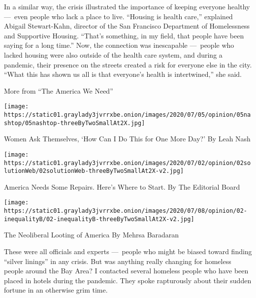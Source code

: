 In a similar way, the crisis illustrated the importance of keeping
everyone healthy ---~even people who lack a place to live. ``Housing is
health care,'' explained Abigail Stewart-Kahn, director of the San
Francisco Department of Homelessness and Supportive Housing. ``That's
something, in my field, that people have been saying for a long time.''
Now, the connection was inescapable ---~people who lacked housing were
also outside of the health care system, and during a pandemic, their
presence on the streets created a risk for everyone else in the city.
``What this has shown us all is that everyone's health is intertwined,''
she said.

 More from ``The America We Need''
\href{https://www.nytimes3xbfgragh.onion/2020/07/04/opinion/sunday/women-work-coronavirus.html?action=click\&pgtype=Article\&state=default\&region=MAIN_CONTENT_2\&context=storylines_related_links}{}

\texttt{[image: https://static01.graylady3jvrrxbe.onion/images/2020/07/05/opinion/05nashtop/05nashtop-threeByTwoSmallAt2X.jpg]}

 Women Ask Themselves, `How Can I Do This for One More Day?' By Leah
Nash

\href{https://www.nytimes3xbfgragh.onion/2020/07/02/opinion/sunday/income-inequality-solutions.html?action=click\&pgtype=Article\&state=default\&region=MAIN_CONTENT_2\&context=storylines_related_links}{}

\texttt{[image: https://static01.graylady3jvrrxbe.onion/images/2020/07/02/opinion/02solutionWeb/02solutionWeb-threeByTwoSmallAt2X-v2.jpg]}

 America Needs Some Repairs. Here's Where to Start. By The Editorial
Board

\href{https://www.nytimes3xbfgragh.onion/2020/07/02/opinion/private-equity-inequality.html?action=click\&pgtype=Article\&state=default\&region=MAIN_CONTENT_2\&context=storylines_related_links}{}

\texttt{[image: https://static01.graylady3jvrrxbe.onion/images/2020/07/08/opinion/02-inequalityB/02-inequalityB-threeByTwoSmallAt2X-v2.jpg]}

 The Neoliberal Looting of America By Mehrsa Baradaran

These were all officials and experts ---~people who might be biased
toward finding ``silver linings'' in any crisis. But was anything really
changing for homeless people around the Bay Area? I contacted several
homeless people who have been placed in hotels during the pandemic. They
spoke rapturously about their sudden fortune in an otherwise grim time.

